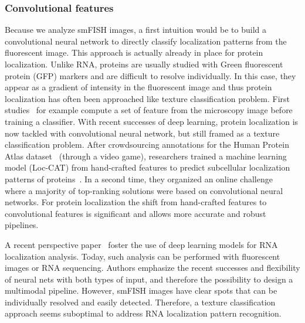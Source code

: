 \subsubsection{Convolutional features}

Because we analyze smFISH images, a first intuition would be to build a convolutional neural network to directly classify localization patterns from the fluorescent image.
This approach is actually already in place for protein localization.
Unlike RNA, proteins are usually studied with Green fluorescent protein (GFP) markers and are difficult to resolve individually.
In this case, they appear as a gradient of intensity in the fluorescent image and thus protein localization has often been approached like texture classification problem.
First studies~\cite{boland_automated_1998} for example compute a set of feature from the microscopy image before training a classifier.
With recent successes of deep learning, protein localization is now tackled with convolutional neural network, but still framed as a texture classification problem.
After crowdsourcing annotations for the Human Protein Atlas dataset~\cite{Uhlen_2015} (through a video game), researchers trained a machine learning model (Loc-CAT) from hand-crafted features to predict subcellular localization patterns of proteins~\cite{sullivan_deep_2018}.
In a second time, they organized an online challenge~\cite{ouyang_analysis_2019} where a majority of top-ranking solutions were based on convolutional neural networks.
For protein localization the shift from hand-crafted features to convolutional features is significant and allows more accurate and robust pipelines.

A recent perspective paper~\cite{Savulescu_2021} foster the use of deep learning models for RNA localization analysis.
Today, such analysis can be performed with fluorescent images or RNA sequencing.
Authors emphasize the recent successes and flexibility of neural nets with both types of input, and therefore the possibility to design a multimodal pipeline.
However, smFISH images have clear spots that can be individually resolved and easily detected.
Therefore, a texture classification approach seems suboptimal to address \ac{RNA} localization pattern recognition.


